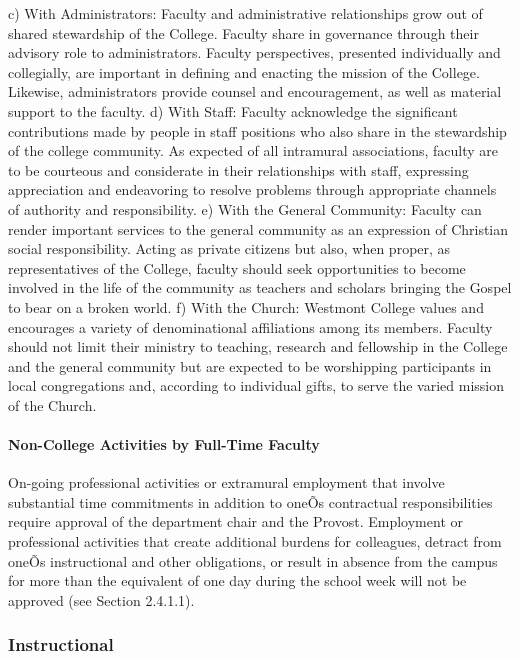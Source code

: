 \documentclass[letterpaper, 11pt]{article}
\begin{document}
				c) With Administrators:  Faculty and administrative relationships grow out of shared stewardship of the College.  Faculty share in governance through their advisory role to administrators.  Faculty perspectives, presented individually and collegially, are important in defining and enacting the mission of the College.  Likewise, administrators provide counsel and encouragement, as well as material support to the faculty.
				d) With Staff:  Faculty acknowledge the significant contributions made by people in staff positions who also share in the stewardship of the college community.  As expected of all intramural associations, faculty are to be courteous and considerate in their relationships with staff, expressing appreciation and endeavoring to resolve problems through appropriate channels of authority and responsibility.
				e) With the General Community:  Faculty can render important services to the general community as an expression of Christian social responsibility.  Acting as private citizens but also, when proper, as representatives of the College, faculty should seek opportunities to become involved in the life of the community as teachers and scholars bringing the Gospel to bear on a broken world.
				f) With the Church:  Westmont College values and encourages a variety of denominational affiliations among its members.  Faculty should not limit their ministry to teaching, research and fellowship in the College and the general community but are expected to be worshipping participants in local congregations and, according to individual gifts, to serve the varied mission of the Church.
			\paragraph{Non-College Activities by Full-Time Faculty}
				On-going professional activities or extramural employment that involve substantial time commitments in addition to oneÕs contractual responsibilities require approval of the department chair and the Provost.  Employment or professional activities that create additional burdens for colleagues, detract from oneÕs instructional and other obligations, or result in absence from the campus for more than the equivalent of one day during the school week will not be approved (see Section 2.4.1.1).
		\subsubsection{Instructional}
\end{document}
